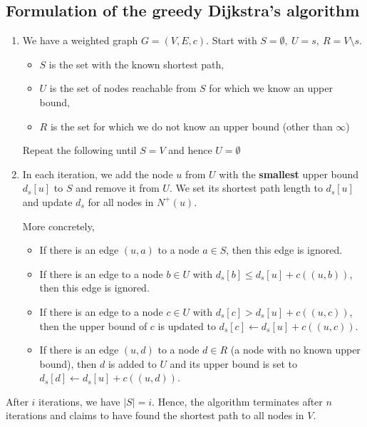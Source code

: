 \documentclass[12pt]{article}
\begin{document}
\subsection{Formulation of the greedy Dijkstra's algorithm}

\begin{enumerate}
    \item We have a weighted graph $G = (V, E, c)$. Start with $S = \emptyset,\ U = {s},\ R = V \setminus {s}$.
        \begin{itemize}
            \item $S$ is the set with the known shortest path,
            \item $U$ is the set of nodes reachable from $S$ for which we know an upper bound,
            \item $R$ is the set for which we do not know an upper bound (other than $\infty$)
        \end{itemize}
        Repeat the following until $S = V$ and hence $U = \emptyset$
    
        \item In each iteration, we add the node $u$ from $U$ with the \textbf{smallest} upper bound $d_s[u]$ to $S$ and remove it from $U$. We set its shortest path length to $d_s[u]$ and update $d_s$ for all nodes in $N^+(u)$.
        
        More concretely,
        
        \begin{itemize}
            \item If there is an edge $(u, a)$ to a node $a \in S$, then this edge is ignored.
            \item If there is an edge to a node $b \in U$ with $d_s[b] \leq d_s[u] + c((u, b))$, then this edge is ignored.
            \item If there is an edge to a node $c \in U$ with $d_s[c] > d_s[u] + c((u, c))$, then the upper bound of $c$ is updated to $d_s[c] \leftarrow d_s[u] + c((u, c))$.
            \item If there is an edge $(u, d)$ to a node $d \in R$ (a node with no known upper bound), then $d$ is added to $U$ and its upper bound is set to $d_s[d] \leftarrow d_s[u] + c((u, d))$.
        \end{itemize}
\end{enumerate}

After $i$ iterations, we have $|S| = i$. Hence, the algorithm terminates after $n$ iterations and claims to have found the shortest path to all nodes in $V$.
\end{document}
